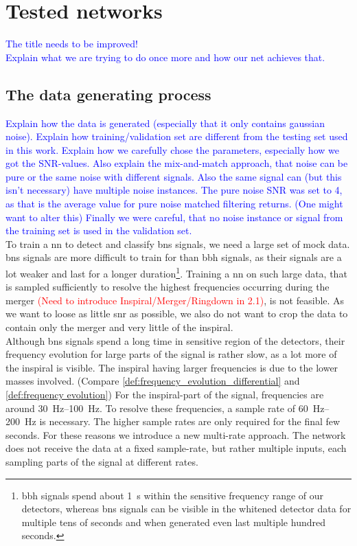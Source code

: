 \section{Tested networks}
\textcolor{blue}{The title needs to be improved!\\Explain what we are trying to do once more and how our net achieves that.}
\subsection{The data generating process}
\textcolor{blue}{Explain how the data is generated (especially that it only contains gaussian noise). Explain how training/validation set are different from the testing set used in this work. Explain how we carefully chose the parameters, especially how we got the SNR-values. Also explain the mix-and-match approach, that noise can be pure or the same noise with different signals. Also the same signal can (but this isn't necessary) have multiple noise instances. The pure noise SNR was set to 4, as that is the average value for pure noise matched filtering returns. (One might want to alter this) Finally we were careful, that no noise instance or signal from the training set is used in the validation set.}\\
To train a \gls{nn} to detect and classify \gls{bns} signals, we need a large set of mock data. \gls{bns} signals are more difficult to train for than \gls{bbh} signals, as their signals are a lot weaker and last for a longer duration\footnote{\gls{bbh} signals spend about \SI{1}{\s} within the sensitive frequency range of our detectors, whereas \gls{bns} signals can be visible in the whitened detector data for multiple tens of seconds \cite{gw170817} and when generated even last multiple hundred seconds.}. Training a \gls{nn} on such large data, that is sampled sufficiently to resolve the highest frequencies occurring during the merger \textcolor{red}{(Need to introduce Inspiral/Merger/Ringdown in 2.1)}, is not feasible. As we want to loose as little \gls{snr} as possible, we also do not want to crop the data to contain only the merger and very little of the inspiral.\\
Although \gls{bns} signals spend a long time in sensitive region of the detectors, their frequency evolution for large parts of the signal is rather slow, as a lot more of the inspiral is visible. The inspiral having larger frequencies is due to the lower masses involved. (Compare \eqref{def:frequency_evolution_differential} and \eqref{def:frequency evolution}) For the inspiral-part of the signal, frequencies are around \SIrange{30}{100}{\hertz}. To resolve these frequencies, a sample rate of \SIrange{60}{200}{\hertz} is necessary. The higher sample rates are only required for the final few seconds. For these reasons we introduce a new multi-rate approach. The network does not receive the data at a fixed sample-rate, but rather multiple inputs, each sampling parts of the signal at different rates.\\
